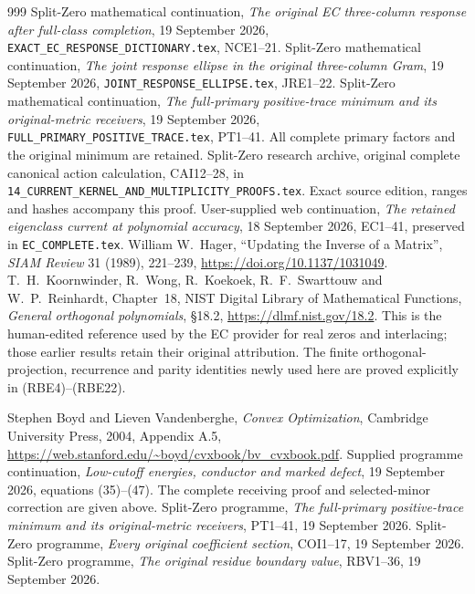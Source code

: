 \documentclass[11pt,a4paper]{article}
\begin{document}
\begin{thebibliography}{999}
 Split-Zero mathematical continuation,
\emph{The original EC three-column response after full-class completion},
19 September 2026, \texttt{EXACT\_EC\_RESPONSE\_DICTIONARY.tex}, NCE1--21.
 Split-Zero mathematical continuation,
\emph{The joint response ellipse in the original three-column Gram},
19 September 2026, \texttt{JOINT\_RESPONSE\_ELLIPSE.tex}, JRE1--22.
 Split-Zero mathematical continuation,
\emph{The full-primary positive-trace minimum and its original-metric
receivers}, 19 September 2026, \texttt{FULL\_PRIMARY\_POSITIVE\_TRACE.tex},
PT1--41. All complete primary factors and the original minimum are retained.
 Split-Zero research archive, original complete canonical
action calculation, CAI12--28, in
\texttt{14\_CURRENT\_KERNEL\_AND\_MULTIPLICITY\_PROOFS.tex}.
Exact source edition, ranges and hashes accompany this proof.
 User-supplied web continuation,
\emph{The retained eigenclass current at polynomial accuracy},
18 September 2026, EC1--41, preserved in \texttt{EC\_COMPLETE.tex}.
 William W.~Hager, ``Updating the Inverse of a Matrix'',
\emph{SIAM Review} 31 (1989), 221--239,
\url{https://doi.org/10.1137/1031049}.
 T.~H.~Koornwinder, R.~Wong, R.~Koekoek,
R.~F.~Swarttouw and W.~P.~Reinhardt, Chapter~18,
NIST Digital Library of Mathematical Functions,
\emph{General orthogonal polynomials}, \S18.2,
\url{https://dlmf.nist.gov/18.2}. This is the human-edited reference
used by the EC provider for real zeros and interlacing; those earlier
results retain their original attribution. The finite orthogonal-
projection, recurrence and parity identities newly used here are
proved explicitly in (RBE4)--(RBE22).

 Stephen Boyd and Lieven Vandenberghe,
\emph{Convex Optimization}, Cambridge University Press, 2004,
Appendix A.5,
\url{https://web.stanford.edu/~boyd/cvxbook/bv_cvxbook.pdf}.
 Supplied programme continuation,
\emph{Low-cutoff energies, conductor and marked defect},
19 September 2026, equations (35)--(47).
The complete receiving proof and selected-minor correction
are given above.
 Split-Zero programme,
\emph{The full-primary positive-trace minimum and its original-metric
receivers}, PT1--41, 19 September 2026.
 Split-Zero programme,
\emph{Every original coefficient section}, COI1--17,
19 September 2026.
 Split-Zero programme,
\emph{The original residue boundary value}, RBV1--36,
19 September 2026.

\end{thebibliography}
\end{document}
